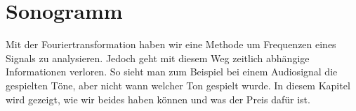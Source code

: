 %
%
%
%
\chapter{Sonogramm\label{chapter:sonogramm}}
\begin{refsection}

Mit der Fouriertransformation haben wir eine Methode um Frequenzen eines Signals zu analysieren.
Jedoch geht mit diesem Weg zeitlich abhängige Informationen verloren.
So sieht man zum Beispiel bei einem Audiosignal die gespielten Töne, aber nicht wann welcher Ton gespielt wurde.
In diesem Kapitel wird gezeigt, wie wir beides haben können und was der Preis dafür ist.







\printbibliography[heading=subbibliography]
\end{refsection}
